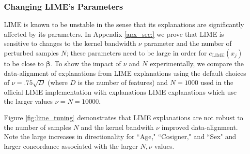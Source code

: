 \documentclass[mnsc,blindrev]{informs3}
\begin{document}
        
        \subsubsection{Changing LIME's Parameters} 
            \label{sec:lime_params}
             LIME is known to be unstable in the sense that its explanations are significantly affected by its parameters. In Appendix \ref{apx_sec:} we prove that LIME is sensitive to changes to the kernel bandwidth $\nu$ parameter and the number of perturbed samples $N$; these parameters need to be large in order for $e_{\text{LIME}}(x_j)$ to be close to $\boldsymbol{\beta}$. To show the impact of $\nu$ and $N$ experimentally, we compare the data-alignment of explanations from LIME explanations using the default choices of $\nu = .75\sqrt{D}$ (where $D$ is the number of features) and $N=1000$ used in the official LIME implementation \citep{ribeiro16lime} with explanations LIME explanations which use the larger values $\nu=N=10000$. 
            
            Figure \ref{fig:lime_tuning} demonstrates that LIME explanations are not robust to the number of samples $N$ and the kernel bandwith $\nu$ improved data-alignment. Note the large increases in directionality for ``Age," ``Cosigner," and ``Sex" and larger concordance associated with the larger $N,\nu$ values.  %
        
\end{document}

